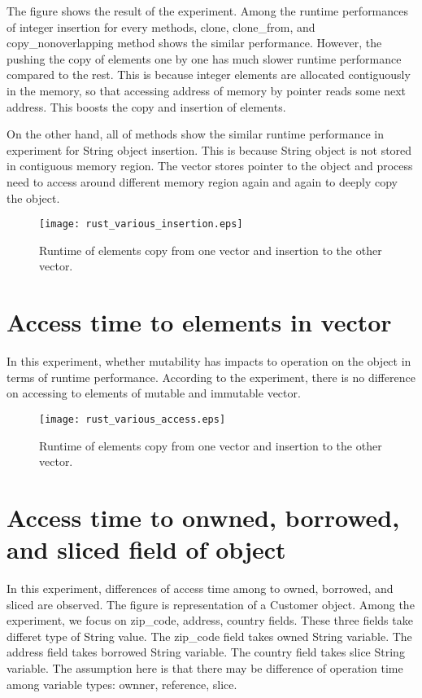 The figure shows the result of the experiment. Among the runtime performances of integer insertion for every methods, 
clone, clone_from, and copy_nonoverlapping method shows the similar performance. However, the pushing the copy of elements one by one has much slower runtime performance 
compared to the rest. This is because integer elements are allocated contiguously in the memory, so that accessing address of memory by pointer reads some next address. 
This boosts the copy and insertion of elements. 

On the other hand, all of methods show the similar runtime performance in experiment for String object insertion. 
This is because String object is not stored in contiguous memory region. The vector stores pointer to the object and 
process need to access around different memory region again and again to deeply copy the object.

\begin{figure}[htb]
    \texttt{[image: rust\_various\_insertion.eps]}
    \caption{Runtime of elements copy from one vector and insertion to the other vector.}
    \label{fig:Sampling}
\end{figure}



\section{Access time to elements in vector}
\label{sec:history}
In this experiment, whether mutability has impacts to operation on the object in terms of runtime performance. 
According to the experiment, there is no difference on accessing to elements of mutable and immutable vector.

\begin{figure}[htb]
    \texttt{[image: rust\_various\_access.eps]}
    \caption{Runtime of elements copy from one vector and insertion to the other vector.}
    \label{fig:Sampling}
\end{figure}

\section{Access time to onwned, borrowed, and sliced field of object}
\label{sec:history}
In this experiment, differences of access time among to owned, borrowed, and sliced are observed. 
The figure is representation of a Customer object. Among the experiment, we focus on zip_code, address, country fields. 
These three fields take differet type of String value. The zip_code field takes owned String variable. 
The address field takes borrowed String variable. The country field takes slice String variable. 
The assumption here is that there may be difference of operation time among variable types: ownner, reference, slice. 

